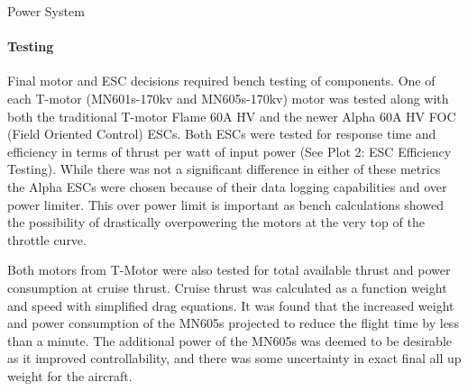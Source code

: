 \begin{subsubsection}{Power System}
\paragraph{Testing}
Final motor and ESC decisions required bench testing of components. One of each T-motor (MN601s-170kv and MN605s-170kv) motor was tested along with both the traditional T-motor Flame 60A HV and the newer Alpha 60A HV FOC (Field Oriented Control) ESCs. Both ESCs were tested for response time and efficiency in terms of thrust per watt of input power (See Plot 2: ESC Efficiency Testing). While there was not a significant difference in either of these metrics the Alpha ESCs were chosen because of their data logging capabilities and over power limiter. This over power limit is important as bench calculations showed the possibility of drastically overpowering the motors at the very top of the throttle curve. 



\vspace{5mm}

Both motors from T-Motor were also tested for total available thrust and power consumption at cruise thrust. Cruise thrust was calculated as a function weight and speed with simplified drag equations. It was found that the increased weight and power consumption of the MN605s projected to reduce the flight time by less than a minute. The additional power of the MN605s was deemed to be desirable as it improved controllability, and there was some uncertainty in exact final all up weight for the aircraft.  


\end{subsubsection}
